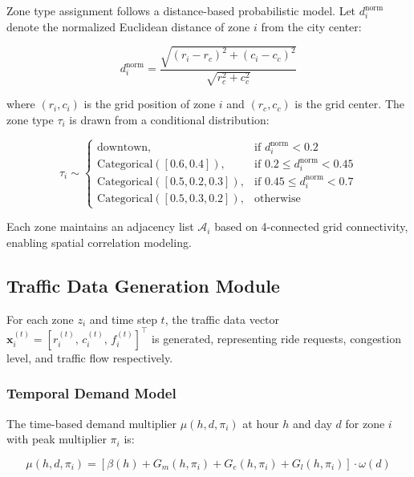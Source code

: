 \documentclass[journal]{IEEEtran}
\begin{document}
Zone type assignment follows a distance-based probabilistic model. Let $d_i^{\text{norm}}$ denote the normalized Euclidean distance of zone $i$ from the city center:

\begin{equation}
d_i^{\text{norm}} = \frac{\sqrt{(r_i - r_c)^2 + (c_i - c_c)^2}}{\sqrt{r_c^2 + c_c^2}}
\label{eq:norm_distance}
\end{equation}

\noindent where $(r_i, c_i)$ is the grid position of zone $i$ and $(r_c, c_c)$ is the grid center. The zone type $\tau_i$ is drawn from a conditional distribution:

\begin{equation}
\tau_i \sim 
\begin{cases}
\text{downtown}, & \text{if } d_i^{\text{norm}} < 0.2 \\
\text{Categorical}([0.6, 0.4]), & \text{if } 0.2 \leq d_i^{\text{norm}} < 0.45 \\
\text{Categorical}([0.5, 0.2, 0.3]), & \text{if } 0.45 \leq d_i^{\text{norm}} < 0.7 \\
\text{Categorical}([0.5, 0.3, 0.2]), & \text{otherwise}
\end{cases}
\label{eq:zone_type}
\end{equation}

Each zone maintains an adjacency list $\mathcal{A}_i$ based on 4-connected grid connectivity, enabling spatial correlation modeling.

\subsection{Traffic Data Generation Module}

For each zone $z_i$ and time step $t$, the traffic data vector $\mathbf{x}_i^{(t)} = [r_i^{(t)},\, c_i^{(t)},\, f_i^{(t)}]^\top$ is generated, representing ride requests, congestion level, and traffic flow respectively.

\subsubsection{Temporal Demand Model}
The time-based demand multiplier $\mu(h, d, \pi_i)$ at hour $h$ and day $d$ for zone $i$ with peak multiplier $\pi_i$ is:

\begin{equation}
\mu(h, d, \pi_i) = \left[\beta(h) + G_m(h, \pi_i) + G_e(h, \pi_i) + G_l(h, \pi_i)\right] \cdot \omega(d)
\label{eq:temporal_mult}
\end{equation}
\end{document}
